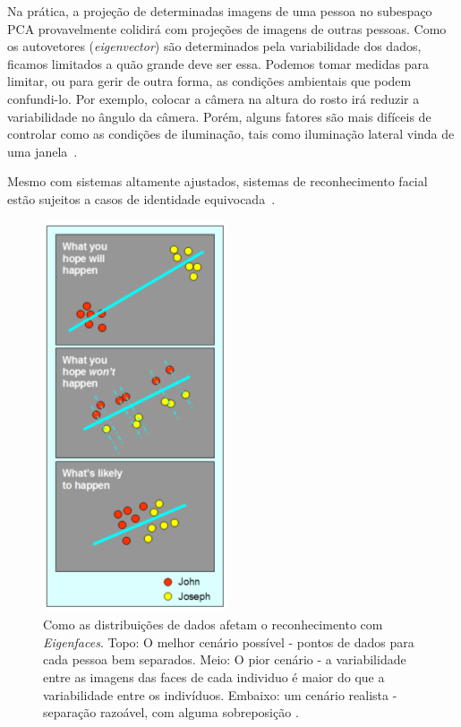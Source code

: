 	Na prática, a projeção de determinadas imagens de uma pessoa no subespaço PCA
	provavelmente colidirá com projeções de imagens de outras pessoas. Como os
	autovetores (\textit{eigenvector}) são determinados pela variabilidade dos
	dados, ficamos limitados a quão grande deve ser essa. Podemos tomar medidas para
	limitar, ou para gerir de outra forma, as condições ambientais que podem
	confundi-lo. Por exemplo, colocar a câmera na altura do rosto irá reduzir a
	variabilidade no ângulo da câmera. Porém, alguns fatores são mais difíceis de
	controlar como as condições de iluminação, tais como iluminação lateral vinda de
	uma janela~\cite{hewitt}.
	
	Mesmo com sistemas altamente ajustados, sistemas de reconhecimento facial estão
	sujeitos a casos de identidade equivocada~\cite{hewitt}.

	\begin{figure}[H]
		\begin{center}
			\includegraphics[scale=6.0]{figuras/2.FundamentacaoTeorica/espacoPCA.png}
		\end{center}
		\caption{Como as distribuições de dados afetam o reconhecimento com \textit{Eigenfaces}. Topo: O melhor cenário possível - pontos de dados para cada pessoa bem separados. Meio: O pior cenário - a variabilidade entre as imagens das faces de cada individuo é maior do que a variabilidade entre os indivíduos. Embaixo: um cenário realista - separação razoável, com alguma sobreposição \cite{hewitt}.}
		\label{exemploEspacoPCA}
	\end{figure}

